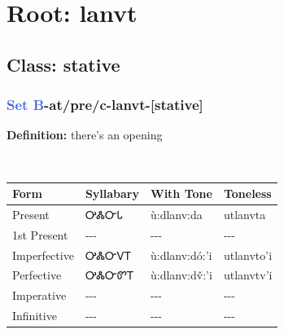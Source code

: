 \needspace{4in}
\section*{Root: lanvt}
\nopagebreak
{}
\needspace{3in}
\subsection*{Class: stative}
\nopagebreak
\needspace{2in}
\subsubsection*{\textcolor{RoyalBlue}{Set B}{-}at/pre/c{-}\textbf{lanvt}{-}[stative]}
\nopagebreak
\textbf{Definition: } there{\textquoteright}s an opening
\\[0.5em]
\begin{tabularx}{\textwidth}{l X X X}%
\toprule%
\textbf{Form}&\textbf{Syllabary}&\textbf{With Tone}&\textbf{Toneless}\\%
\midrule%
Present&ᎤᏜᏅᏓ&ù:dlanv:da&utlanvta\\%
1st Present&{-}{-}{-}&{-}{-}{-}&{-}{-}{-}\\%
Imperfective&ᎤᏜᏅᏙᎢ&ù:dlanv:dó:’i&utlanvto'i\\%
Perfective&ᎤᏜᏅᏛᎢ&ù:dlanv:dv̌:’i&utlanvtv'i\\%
Imperative&{-}{-}{-}&{-}{-}{-}&{-}{-}{-}\\%
Infinitive&{-}{-}{-}&{-}{-}{-}&{-}{-}{-}\\%
\bottomrule%
\end{tabularx}
\\[1em]